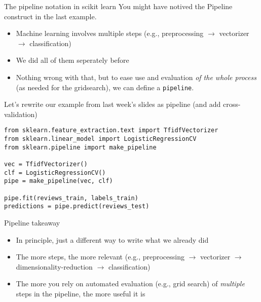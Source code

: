 \begin{frame}{The pipeline notation in scikit learn}
You might have notived the Pipeline construct in the last example.
\begin{itemize}
\item Machine learning involves multiple steps (e.g., preprocessing $\rightarrow$ vectorizer $\rightarrow$ classification)
\item We did all of them seperately before
\item Nothing wrong with that, but to ease use and evaluation \emph{of the whole process} (as needed for the gridsearch), we can define a \texttt{pipeline}.
\end{itemize}
	
\end{frame}

\begin{frame}[fragile]{Let's rewrite our example from last week's slides as pipeline (and add cross-validation)}
\begin{verbatim}
from sklearn.feature_extraction.text import TfidfVectorizer
from sklearn.linear_model import LogisticRegressionCV
from sklearn.pipeline import make_pipeline

vec = TfidfVectorizer()
clf = LogisticRegressionCV()
pipe = make_pipeline(vec, clf)

pipe.fit(reviews_train, labels_train)
predictions = pipe.predict(reviews_test)
\end{verbatim}
\end{frame}

\begin{frame}{Pipeline takeaway}
  \begin{itemize}
  \item In principle, just a different way to write what we already did
  \item The more steps, the more relevant (e.g., preprocessing $\rightarrow$ vectorizer $\rightarrow$ dimensionality-reduction $\rightarrow$ classification)
  \item The more you rely on automated evaluation (e.g., grid search) of \emph{multiple} steps in the pipeline, the more useful it is
  \end{itemize}
\end{frame}




